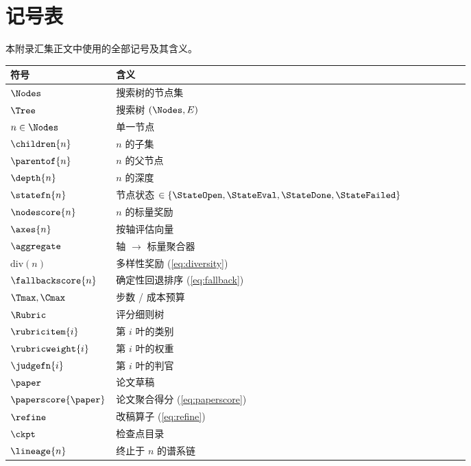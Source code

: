 \section{记号表}\label{sec:notation}

本附录汇集正文中使用的全部记号及其含义。

\begin{longtable}{@{}l p{0.78\linewidth}@{}}
  \toprule
  符号 & 含义 \\
  \midrule
  $\Nodes$            & 搜索树的节点集 \\
  $\Tree$             & 搜索树 $(\Nodes, E)$ \\
  $n\in\Nodes$        & 单一节点 \\
  $\children{n}$      & $n$ 的子集 \\
  $\parentof{n}$      & $n$ 的父节点 \\
  $\depth{n}$         & $n$ 的深度 \\
  $\statefn{n}$       & 节点状态 $\in\{\StateOpen,\StateEval,\StateDone,\StateFailed\}$ \\
  $\nodescore{n}$     & $n$ 的标量奖励 \\
  $\axes{n}$          & 按轴评估向量 \\
  $\aggregate$        & 轴 $\to$ 标量聚合器 \\
  $\mathrm{div}(n)$   & 多样性奖励 (\cref{eq:diversity}) \\
  $\fallbackscore{n}$ & 确定性回退排序 (\cref{eq:fallback}) \\
  $\Tmax,\Cmax$       & 步数 / 成本预算 \\
  $\Rubric$           & 评分细则树 \\
  $\rubricitem{i}$    & 第 $i$ 叶的类别 \\
  $\rubricweight{i}$  & 第 $i$ 叶的权重 \\
  $\judgefn{i}$       & 第 $i$ 叶的判官 \\
  $\paper$            & 论文草稿 \\
  $\paperscore{\paper}$ & 论文聚合得分 (\cref{eq:paperscore}) \\
  $\refine$           & 改稿算子 (\cref{eq:refine}) \\
  $\ckpt$             & 检查点目录 \\
  $\lineage{n}$       & 终止于 $n$ 的谱系链 \\
  \bottomrule
\end{longtable}
